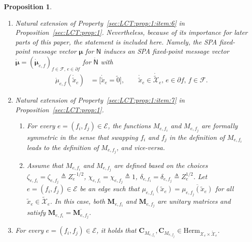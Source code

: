 \documentclass[journal]{IEEEtran}
\newcommand{\add}[1]{{\color{black}#1}}
\newtheorem{proposition}[theorem]{Proposition}
\newcommand{\vect}[1]{ \bm{#1} }
\newcommand{\setEfull}{ \mathcal{E} }
\newcommand{\setF}{ \mathcal{F} }
\newcommand{\setpf}{ \partial f }
\newcommand{\setxe}{ \mathcal{X}_{e} }
\newcommand{\vmu}{ \vect{ \mu } }
\newcommand{\graphN}{ \mathsf{N} }
\newcommand{\setE}{ \mathcal{E} }
\newcommand{\defeq}{ \triangleq }
\newcommand{\setHerm}[1]{ \mathrm{Herm}_{#1} }
\newcommand{\tset}[1]{\tilde{\mathcal{#1}}}
\newcommand{\matr}[1]{\vect{#1}}
\newcommand{\LCTtset}[1]{\mathring{\tilde{\mathcal{#1}}}}
\newcommand{\LCTset}[1]{\mathring{\mathcal{#1}}}
\newcommand{\LCTv}[1]{ \mathring{ \vect{#1} } }
\newcommand{\LCT}[1]{ \mathring{#1} }
\newcommand{\LCTt}[1]{ \mathring{ \tilde{#1} } }
\newcommand{\efi}{ e,f_i }
\newcommand{\efj}{ e,f_j }
\newcommand{\LCTsetxe}{ \LCTset{X}_{e} }
\newcommand{\txe}{ \tilde{x}_{e} }
\newcommand{\tzero}{\tilde{0}}
\begin{document}
\begin{proposition}
\begin{enumerate}
    \item Natural extension of Property~\ref{sec:LCT:prop:1:item:6} in Proposition~\ref{sec:LCT:prop:1}.
          Nevertheless, because of its importance
          for later parts of this paper, the statement is included here. Namely, the
          SPA fixed-point message vector
          $\vmu$ for
          $\graphN$ induces an SPA fixed-point message vector $ \LCTv{\mu}
            = ( \LCTv{\mu}_{e,f} )_{f \in \setF,\,e \in \setpf} $
          for
          $\LCT{\graphN}$ with
          \begin{align*}
            \LCT{\mu}_{e,f}(\LCTt{x}_{e})
             & = \bigl[ \LCTt{x}_{e} \! = \! \tzero \bigr],
            \qquad
            \LCTt{x}_{e} \in \LCTtset{X}_{e}, \,
            e \in \setpf, \, f \in \setF.
          \end{align*}

    \item\label{prop:DENFG:LCT:1:item:7} Natural extension of Property~\ref{sec:LCT:prop:1:item:7} in Proposition~\ref{sec:LCT:prop:1}.
          \begin{enumerate}
            \item For every $e = (f_{i},f_{j}) \in \setE$, the functions $M_{\efi}$ and
                  $M_{\efj}$ are formally symmetric in the sense that swapping $f_{i}$ and
                  $f_{j}$ in the definition of $M_{\efi}$ leads to the definition of
                  $M_{\efj}$, and vice-versa.

            \item Assume that $M_{\efi}$ and $M_{\efj}$ are defined based on the
                  choices $\zeta_{\efi} = \zeta_{\efj} \defeq Z_e^{-1/2}$,
                  $\chi_{\efi} = \chi_{\efj} \defeq 1$,
                  $\delta_{\efi} = \delta_{\efj} \defeq Z_e^{1/2}$.
                  Let
                  $e = (f_{i},f_{j}) \in \setE$ be an edge such that
                  $\mu_{\efi}(\txe) = \overline{\mu_{\efj}(\txe)}$ for all $\txe \in \tset{X}_e$.
                  In this case, both $ \matr{M}_{\efi} $ and $ \matr{M}_{\efj} $ are unitary matrices and satisfy
                  $ \matr{M}_{\efi} = \overline{\matr{M}_{\efj}} $.
          \end{enumerate}

    \item\label{prop:DENFG:LCT:1:item:8} \add{For every
            $ e = (f_{i}, f_{j}) \in \setEfull $, it holds that
            $ \matr{ C }_{ M_{\efi} },\matr{ C }_{ M_{\efj} } \in \setHerm{
                \setxe \times \LCTsetxe } $.}


\end{enumerate}
\end{proposition}
\end{document}
